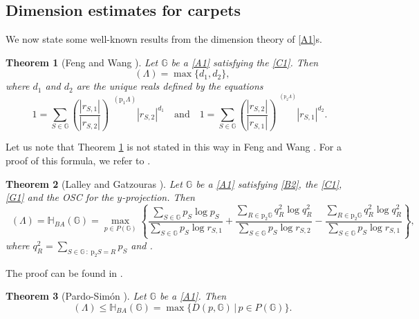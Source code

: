\documentclass[a4paper, 11pt]{article}
\DeclareMathOperator{\dH}{\dim_{\mathrm{H}}}
\DeclareMathOperator{\dB}{\dim_{\mathrm{B}}}
\numberwithin{equation}{section}
\theoremstyle{plain}
\newtheorem{theorem}{Theorem}[section]
\theoremstyle{remark}
\theoremstyle{definition}
\begin{document}
\subsection{Dimension estimates for carpets}

We now state some well-known results from the dimension theory of \ref{A1}s.

\begin{theorem}[Feng and Wang \cite{MR2128947}]\label{thm:FW}
	Let $\mathbb{G}$ be a \ref{A1} satisfying the \ref{C1}. Then \[\dB(\Lambda)=\max\{d_1,d_2\},\]where $d_1$ and $d_2$ are the unique reals defined by the equations
	\[
	1= \sum_{S\in \mathbb{G}} \left( \frac{|r_{S,1}|}{|r_{S,2}|} \right)^{\dB(\mathrm{p}_1\Lambda)} |r_{S,2}|^{d_1} \quad \text{and} \quad 1= \sum_{S \in \mathbb{G}} \left( \frac{|r_{S,2}|}{|r_{S,1}|} \right)^{^{\dB(\mathrm{p}_2\Lambda)}} |r_{S,1}|^{d_2}.
	\]
\end{theorem}

Let us note that Theorem \ref{thm:FW} is not stated in this way in Feng and Wang \cite{MR2128947}. For a proof of this formula, we refer to \cite[Theorem~11.4.2]{MR4661364}.

\begin{theorem}[Lalley and Gatzouras \cite{MR1183358}]\label{thm:GL}
	Let $\mathbb{G}$ be a \ref{A1} satisfying \ref{B2}, the \ref{C1}, \ref{G1} and the OSC for the $y$-projection. Then
	\begin{equation*}
		\dH(\Lambda) = 	\mathbb{H}_{BA}(\mathbb{G})=\max_{p\in P(\mathbb{G})}\left\{\frac{\sum\limits_{S \in \mathbb{G}} p_S \log p_S}{\sum\limits_{S \in \mathbb{G}} p_S \log r_{S,1}}
		+ \frac{\sum\limits_{R \in \mathrm{p}_2\mathbb{G}} q_{R}^2 \log q_{R}^2}{\sum\limits_{S \in \mathbb{G}} p_S \log r_{S,2}}
		- \frac{\sum\limits_{R \in \mathrm{p}_2\mathbb{G}} q_{R}^2 \log q_{R}^2}{\sum\limits_{S \in \mathbb{G}} p_S \log r_{S,1}}\right\},
	\end{equation*}
	where $q_{R}^2=\sum_{S\in\mathbb{G}\ :\ \mathrm{p}_2S=R}p_S$ and .
\end{theorem}

The proof can be found in \cite[Theorem~5.3]{MR1183358}.

\begin{theorem}[Pardo-Sim\'on \cite{simon2017dimensionsoverlappinggeneralizationbaranski}]\label{thm:PS}
	Let $\mathbb{G}$ be a \ref{A1}. Then
	\begin{equation*}
		\dH(\Lambda) \leq	\mathbb{H}_{BA}(\mathbb{G})=\max\{D(p,\mathbb{G})\, \big|\, p \in P(\mathbb{G})\}.
	\end{equation*}
\end{theorem}
\end{document}
